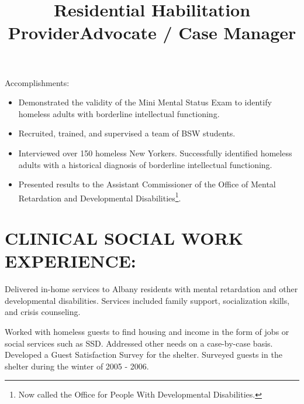 \documentclass[line, mm, 10pt]{res}
\begin{document}
\begin{resume}
\begin{position}
    Accomplishments:
    \begin{itemize}
    \item Demonstrated the validity of the Mini Mental Status Exam to
      identify homeless adults with borderline intellectual functioning.
    \item Recruited, trained, and supervised a team of BSW students.
    \item Interviewed over 150 homeless New Yorkers. Successfully
      identified homeless adults with a historical diagnosis of
      borderline intellectual functioning.
    \item Presented results to the Assistant Commissioner
      of the Office of Mental Retardation and Developmental
      Disabilities\footnote{Now called the Office for People With
        Developmental Disabilities.}.
    \end{itemize}
  \end{position}


  \section{CLINICAL SOCIAL WORK EXPERIENCE:}

  \title{Residential Habilitation Provider}
  \begin{position}
    Delivered in-home services to Albany residents with mental
    retardation and other developmental disabilities. Services included
    family support, socialization skills, and crisis counseling.
  \end{position}

  \title{Advocate / Case Manager}
  \begin{position}
    Worked with homeless guests to find housing and income in the form
    of jobs or social services such as SSD. Addressed other needs on a case-by-case
    basis. Developed a Guest Satisfaction Survey for the shelter. Surveyed
    guests in the shelter during the winter of 2005 - 2006.
  \end{position}


\end{resume}
\end{document}
